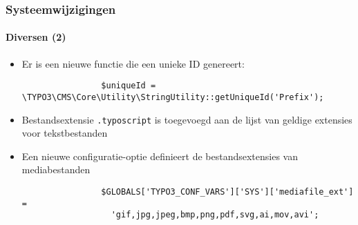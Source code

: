 \begin{frame}[fragile]
	\frametitle{Systeemwijzigingen}
	\framesubtitle{Diversen (2)}


	\begin{itemize}

		\item Er is een nieuwe functie die een unieke ID genereert:

			\begin{lstlisting}
				$uniqueId = \TYPO3\CMS\Core\Utility\StringUtility::getUniqueId('Prefix');
			\end{lstlisting}

		\item Bestandsextensie \texttt{.typoscript} is toegevoegd aan de lijst van
			geldige extensies voor tekstbestanden

		\item Een nieuwe configuratie-optie definieert de bestandsextensies van mediabestanden

			\begin{lstlisting}
				$GLOBALS['TYPO3_CONF_VARS']['SYS']['mediafile_ext'] =
				  'gif,jpg,jpeg,bmp,png,pdf,svg,ai,mov,avi';
			\end{lstlisting}

	\end{itemize}

	\breakingchange

\end{frame}

